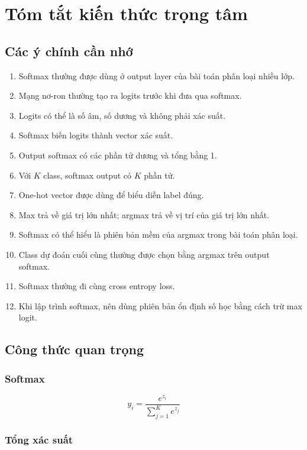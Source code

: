 \documentclass[12pt,a4paper]{report}
\begin{document}
\chapter{Tóm tắt kiến thức trọng tâm}

\section{Các ý chính cần nhớ}

\begin{enumerate}
    \item Softmax thường được dùng ở output layer của bài toán phân loại nhiều lớp.
    \item Mạng nơ-ron thường tạo ra logits trước khi đưa qua softmax.
    \item Logits có thể là số âm, số dương và không phải xác suất.
    \item Softmax biến logits thành vector xác suất.
    \item Output softmax có các phần tử dương và tổng bằng 1.
    \item Với $K$ class, softmax output có $K$ phần tử.
    \item One-hot vector được dùng để biểu diễn label đúng.
    \item Max trả về giá trị lớn nhất; argmax trả về vị trí của giá trị lớn nhất.
    \item Softmax có thể hiểu là phiên bản mềm của argmax trong bài toán phân loại.
    \item Class dự đoán cuối cùng thường được chọn bằng argmax trên output softmax.
    \item Softmax thường đi cùng cross entropy loss.
    \item Khi lập trình softmax, nên dùng phiên bản ổn định số học bằng cách trừ max logit.
\end{enumerate}

\section{Công thức quan trọng}

\subsection*{Softmax}

\[
    y_i =
    \frac{e^{z_i}}
    {\sum_{j=1}^{K}e^{z_j}}
\]

\subsection*{Tổng xác suất}
\end{document}
